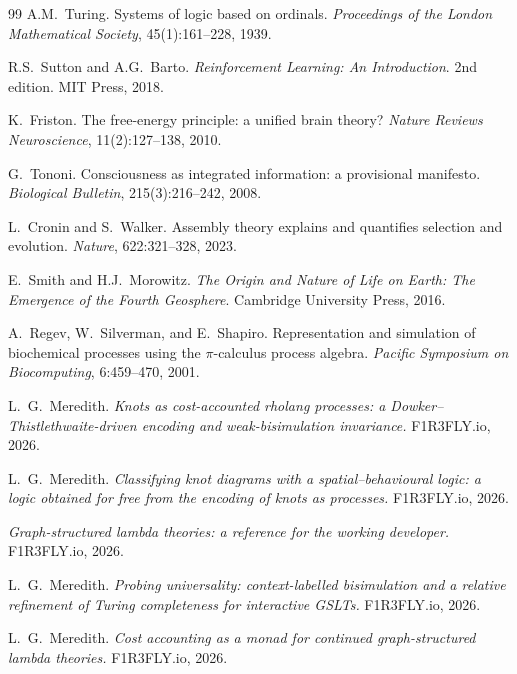 \begin{thebibliography}{99}
A.M.~Turing. \newblock Systems of logic based on ordinals. \newblock \emph{Proceedings of the London Mathematical Society}, 45(1):161--228, 1939.

R.S.~Sutton and A.G.~Barto. \newblock \emph{Reinforcement Learning: An Introduction}. \newblock 2nd edition. MIT Press, 2018.

K.~Friston. \newblock The free-energy principle: a unified brain theory? \newblock \emph{Nature Reviews Neuroscience}, 11(2):127--138, 2010.

G.~Tononi. \newblock Consciousness as integrated information: a provisional manifesto. \newblock \emph{Biological Bulletin}, 215(3):216--242, 2008. %

L.~Cronin and S.~Walker. \newblock Assembly theory explains and quantifies selection and evolution. \newblock \emph{Nature}, 622:321--328, 2023.

E.~Smith and H.J.~Morowitz. \newblock \emph{The Origin and Nature of Life on Earth: The Emergence of the Fourth Geosphere}. \newblock Cambridge University Press, 2016.

A.~Regev, W.~Silverman, and E.~Shapiro. \newblock Representation and simulation of biochemical processes using the $\pi$-calculus process algebra. \newblock \emph{Pacific Symposium on Biocomputing}, 6:459--470, 2001.

L.\ G.\ Meredith. \emph{Knots as cost-accounted rholang processes: a Dowker--Thistlethwaite-driven encoding and weak-bisimulation invariance.} F1R3FLY.io, 2026.

L.\ G.\ Meredith. \emph{Classifying knot diagrams with a spatial--behavioural logic: a logic obtained for free from the encoding of knots as processes.} F1R3FLY.io, 2026.

\emph{Graph-structured lambda theories: a reference for the working developer.} F1R3FLY.io, 2026.

L.\ G.\ Meredith. \emph{Probing universality: context-labelled bisimulation and a relative refinement of Turing completeness for interactive GSLTs.} F1R3FLY.io, 2026.

L.\ G.\ Meredith. \emph{Cost accounting as a monad for continued graph-structured lambda theories.} F1R3FLY.io, 2026.


\end{thebibliography}
